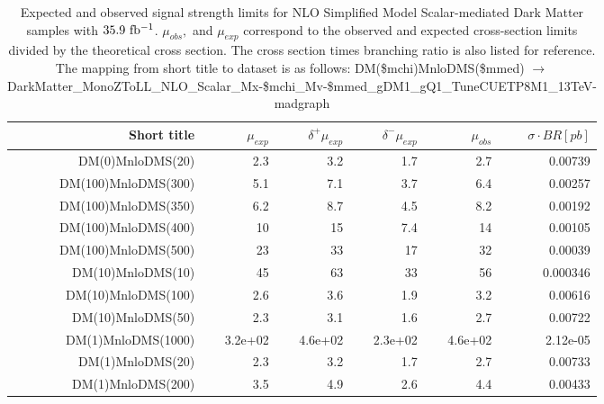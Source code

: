 \begin{table}[hbtp]
  \caption{
    Expected and observed signal strength limits for NLO Simplified Model Scalar-mediated Dark Matter samples with $35.9~\mathrm{fb^{-1}}$.
    $\mu_{obs},$ and $\mu_{exp}$ correspond to the observed and expected cross-section limits divided by the theoretical cross section.
    The cross section times branching ratio is also listed for reference.
    The mapping from short title to dataset is as follows:
    {\footnotesize DM(\$mchi)MnloDMS(\$mmed) $\rightarrow$ DarkMatter\_MonoZToLL\_NLO\_Scalar\_Mx-\$mchi\_Mv-\$mmed\_gDM1\_gQ1\_TuneCUETP8M1\_13TeV-madgraph }
  }
  \label{tab:scalar_limits}
  \begin{center}
{\footnotesize
  \begin{tabular}{rrrrrr}
\hline 
Short title               & $\mu_{exp}$  & $\delta^{+}\mu_{exp}$ & $\delta^{-}\mu_{exp}$ & $\mu_{obs}$  & $\sigma \cdot BR [pb]$ \\
\hline
DM(0)MnloDMS(20)          & 2.3          & 3.2          & 1.7          & 2.7          & 0.00739         \\
DM(100)MnloDMS(300)       & 5.1          & 7.1          & 3.7          & 6.4          & 0.00257         \\
DM(100)MnloDMS(350)       & 6.2          & 8.7          & 4.5          & 8.2          & 0.00192         \\
DM(100)MnloDMS(400)       & 10           & 15           & 7.4          & 14           & 0.00105         \\
DM(100)MnloDMS(500)       & 23           & 33           & 17           & 32           & 0.00039         \\
DM(10)MnloDMS(10)         & 45           & 63           & 33           & 56           & 0.000346        \\
DM(10)MnloDMS(100)        & 2.6          & 3.6          & 1.9          & 3.2          & 0.00616         \\
DM(10)MnloDMS(50)         & 2.3          & 3.1          & 1.6          & 2.7          & 0.00722         \\
DM(1)MnloDMS(1000)        & 3.2e+02      & 4.6e+02      & 2.3e+02      & 4.6e+02      & 2.12e-05        \\
DM(1)MnloDMS(20)          & 2.3          & 3.2          & 1.7          & 2.7          & 0.00733         \\
DM(1)MnloDMS(200)         & 3.5          & 4.9          & 2.6          & 4.4          & 0.00433         \\

\end{tabular}}
\end{center}
\end{table}
